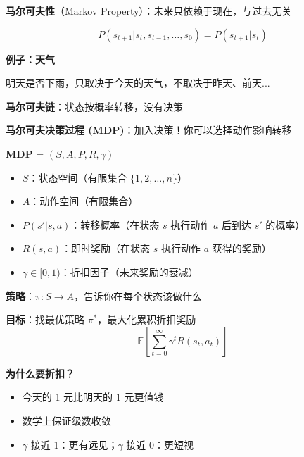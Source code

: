 \documentclass[12pt, a4paper]{ctexart}
\begin{document}
\begin{blackboard}[什么是马尔可夫性？]

\textbf{马尔可夫性}（Markov Property）：未来只依赖于现在，与过去无关

\[
P(s_{t+1} | s_t, s_{t-1}, \ldots, s_0) = P(s_{t+1} | s_t)
\]

\textbf{例子：天气}

\begin{center}
\end{center}

明天是否下雨，只取决于今天的天气，不取决于昨天、前天...

\textbf{马尔可夫链}：状态按概率转移，没有决策

\textbf{马尔可夫决策过程 (MDP)}：加入决策！你可以选择动作影响转移

\end{blackboard}

\begin{blackboard}

\textbf{MDP} = $(S, A, P, R, \gamma)$

\begin{itemize}
    \item $S$：状态空间（有限集合 $\{1, 2, \ldots, n\}$）
    \item $A$：动作空间（有限集合）
    \item $P(s' | s, a)$：转移概率（在状态 $s$ 执行动作 $a$ 后到达 $s'$ 的概率）
    \item $R(s, a)$：即时奖励（在状态 $s$ 执行动作 $a$ 获得的奖励）
    \item $\gamma \in [0, 1)$：折扣因子（未来奖励的衰减）
\end{itemize}

\textbf{策略}：$\pi: S \to A$，告诉你在每个状态该做什么

\textbf{目标}：找最优策略 $\pi^*$，最大化累积折扣奖励
\[
\mathbb{E}\left[ \sum_{t=0}^\infty \gamma^t R(s_t, a_t) \right]
\]

\textbf{为什么要折扣？}
\begin{itemize}
    \item 今天的 1 元比明天的 1 元更值钱
    \item 数学上保证级数收敛
    \item $\gamma$ 接近 1：更有远见；$\gamma$ 接近 0：更短视
\end{itemize}

\end{blackboard}
\end{document}

